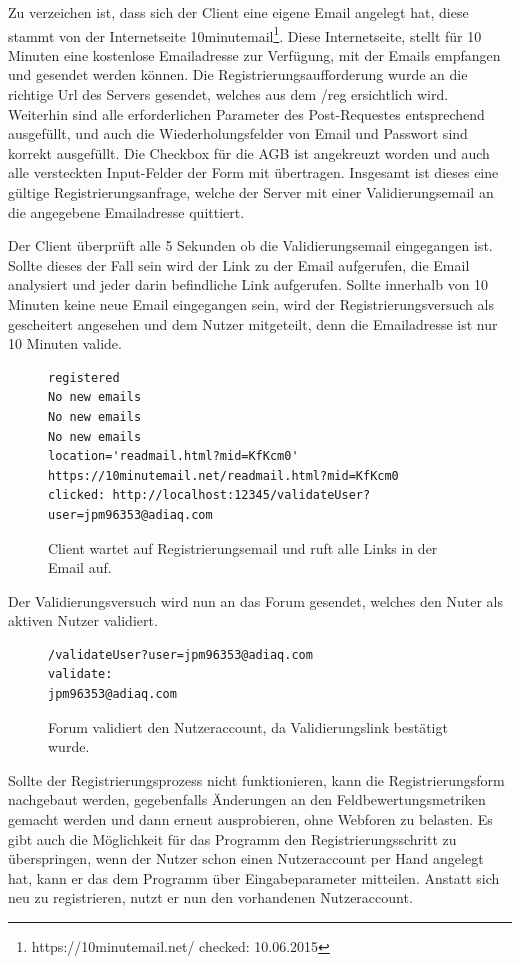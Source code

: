 Zu verzeichen ist, dass sich der Client eine eigene Email angelegt hat, diese stammt von der Internetseite 10minutemail\footnote{https://10minutemail.net/ checked: 10.06.2015}.
Diese Internetseite, stellt für 10 Minuten eine kostenlose Emailadresse zur Verfügung, mit der Emails empfangen und gesendet werden können. Die Registrierungsaufforderung wurde an die richtige Url des Servers gesendet, welches aus dem /reg ersichtlich wird. Weiterhin sind alle erforderlichen Parameter des Post-Requestes entsprechend ausgefüllt, und auch die Wiederholungsfelder von Email und Passwort sind korrekt ausgefüllt. Die Checkbox für die AGB ist angekreuzt worden und auch alle versteckten Input-Felder der Form mit übertragen. Insgesamt ist dieses eine gültige Registrierungsanfrage, welche der Server mit einer Validierungsemail an die angegebene Emailadresse quittiert.

Der Client überprüft alle 5 Sekunden ob die Validierungsemail eingegangen ist. Sollte dieses der Fall sein wird der Link zu der Email aufgerufen, die Email analysiert und jeder darin befindliche Link aufgerufen. Sollte innerhalb von 10 Minuten keine neue Email eingegangen sein, wird der Registrierungsversuch als gescheitert angesehen und dem Nutzer mitgeteilt, denn die Emailadresse ist nur 10 Minuten valide.

\begin{figure}[ht]
\begin{lstlisting}[language=HTML5]
registered
No new emails
No new emails
No new emails
location='readmail.html?mid=KfKcm0'
https://10minutemail.net/readmail.html?mid=KfKcm0
clicked: http://localhost:12345/validateUser?user=jpm96353@adiaq.com
\end{lstlisting}
\caption{Client wartet auf Registrierungsemail und ruft alle Links in der Email auf.}
\end{figure}

Der Validierungsversuch wird nun an das Forum gesendet, welches den Nuter als aktiven Nutzer validiert.

\begin{figure}[ht]
\begin{lstlisting}[language=HTML5]
/validateUser?user=jpm96353@adiaq.com
validate:
jpm96353@adiaq.com
\end{lstlisting}
\caption{Forum validiert den Nutzeraccount, da Validierungslink bestätigt wurde.}
\end{figure}

Sollte der Registrierungsprozess nicht funktionieren, kann die Registrierungsform nachgebaut werden, gegebenfalls Änderungen an den Feldbewertungsmetriken gemacht werden und dann erneut ausprobieren, ohne Webforen zu belasten. Es gibt auch die Möglichkeit für das Programm den Registrierungsschritt zu überspringen, wenn der Nutzer schon einen Nutzeraccount per Hand angelegt hat, kann er das dem Programm über Eingabeparameter mitteilen. Anstatt sich neu zu registrieren, nutzt er nun den vorhandenen Nutzeraccount.


